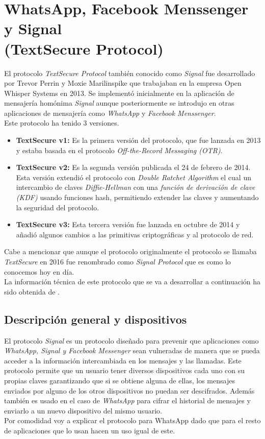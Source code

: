 \section{WhatsApp, Facebook Menssenger y Signal\\ (TextSecure Protocol)}
El protocolo \emph{TextSecure Protocol} también conocido como \emph{Signal} fue desarrollado por Trevor Perrin y Moxie Marilinspike que trabajaban en la empresa Open Whisper Systems en 2013. Se implementó inicialmente en la aplicación de mensajería homónima \emph{Signal} aunque posteriormente se introdujo en otras aplicaciones de mensajería como \emph{WhatsApp} y \emph{Facebook Menssenger}.\\
Este protocolo ha tenido 3 versiones.
\begin{itemize}
	\item \textbf{TextSecure v1:} Es la primera versión del protocolo, que fue lanzada en 2013 y estaba basada en el protocolo \emph{Off-the-Record Messaging (OTR)}.
	\item \textbf{TextSecure v2:} Es la segunda versión publicada el 24 de febrero de 2014. Esta versión extendió el protocolo con \emph{Double Ratchet Algorithm} el cual un intercambio de claves \emph{Diffie-Hellman} con una \emph{función de derivación de clave (KDF)} usando funciones hash, permitiendo extender las claves y aumentando la seguridad del protocolo.
	\item \textbf{TextSecure v3:} Esta tercera versión fue lanzada en octubre de 2014 y añadió algunos cambios a las primitivas criptográficas y al protocolo de red.
\end{itemize}
Cabe a mencionar que aunque el protocolo originalmente el protocolo se llamaba \emph{TextSecure} en 2016 fue renombrado como \emph{Signal Protocol} que es como lo conocemos hoy en día.\\
La información técnica de este protocolo que se va a desarrollar a continuación ha sido obtenida de \cite{November2021b}.

\subsection{Descripción general y dispositivos}
El protocolo \emph{Signal} es un protocolo diseñado para prevenir que aplicaciones como \emph{WhatsApp, Signal y Facebook Messenger} sean vulneradas de manera que se pueda acceder a la información intercambiada en los mensajes y las llamadas. Este protocolo permite que un usuario tener diversos dispositivos cada uno con su propias claves garantizando que si se obtiene alguna de ellas, los mensajes enviados por alguno de los otros dispositivos no puedan ser descifrados. Además también es usado en el caso de \emph{WhatsApp} para cifrar el historial de mensajes y enviarlo a un nuevo dispositivo del mismo usuario.\\
Por comodidad voy a explicar el protocolo para WhatsApp dado que para el resto de aplicaciones que lo usan hacen un uso igual de este.\\

